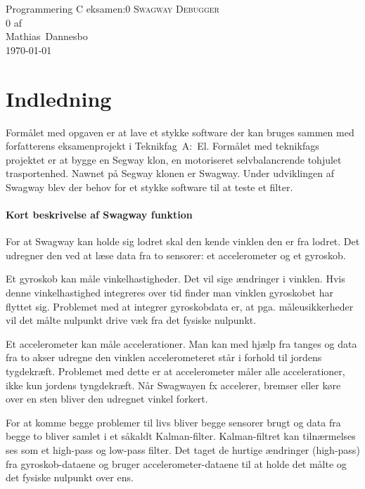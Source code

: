 \documentclass[a4paper,oneside,article,danish,table]{memoir}
\newcommand{\authorvar}{Mathias~Dannesbo}
\newcommand{\pretitlevar}{Programmering C eksamen:}
\newcommand{\titlevar}{Swagway Debugger}
\newcommand{\subtitlevar}{0}
\newcommand{\datevar}{\today}
\begin{document}

\begin{center}
  \if\pretitlevar 0
  \else{\Large\pretitlevar\\} \fi
  \textsc{\HUGE\titlevar\\}
  \if\subtitlevar 0
  \else {\Large\subtitlevar\\} \fi
  {\LARGE 
  af\\
   \authorvar}\\
 \datevar\\
\end{center}
\thispagestyle{empty}

\chapter{Indledning}
Formålet med opgaven er at lave et stykke software der kan bruges sammen med forfatterens eksamenprojekt i Teknikfag~A:~El. Formålet med teknikfags projektet er at bygge en Segway klon, en motoriseret selvbalancrende tohjulet trasportenhed. Nawnet på Segway klonen er Swagway. Under udviklingen af Swagway blev der behov for et stykke software til at teste et filter.

\subsubsection{Kort beskrivelse af Swagway funktion}
For at Swagway kan holde sig lodret skal den kende vinklen den er fra lodret. Det udregner den ved at læse data fra to sensorer: et accelerometer og et gyroskob.

Et gyroskob kan måle vinkelhastigheder. Det vil sige ændringer i vinklen. Hvis denne vinkelhastighed integreres over tid finder man vinklen gyroskobet har flyttet sig. Problemet med at integrer gyroskobdata er, at pga. måleusikkerheder vil det målte nulpunkt drive væk fra det fysiske nulpunkt.

Et accelerometer kan måle accelerationer. Man kan med hjælp fra tanges og data fra to akser udregne den vinklen accelerometeret står i forhold til jordens tygdekræft. Problemet med dette er at accelerometer måler alle accelerationer, ikke kun jordens tyngdekræft. Når Swagwayen fx accelerer, bremser eller køre over en sten bliver den udregnet vinkel forkert.

For at komme begge problemer til livs bliver begge sensorer brugt og data fra begge to bliver samlet i et såkaldt Kalman-filter. Kalman-filtret kan tilnærmelses ses som et high-pass og low-pass filter. Det taget de hurtige ændringer (high-pass) fra gyroskob-dataene og bruger accelerometer-dataene til at holde det målte og det fysiske nulpunkt over ens.
\end{document}
